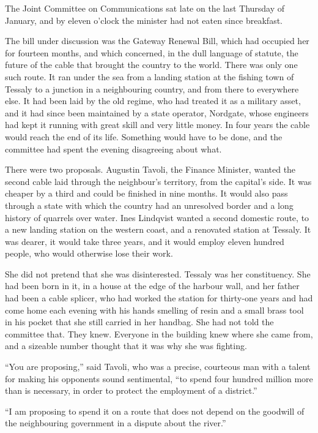 \scenebreak
\noindent The Joint Committee on Communications sat late on the last Thursday of January, and by eleven o'clock the minister had not eaten since breakfast.

The bill under discussion was the Gateway Renewal Bill, which had occupied her for fourteen months, and which concerned, in the dull language of statute, the future of the cable that brought the country to the world. There was only one such route. It ran under the sea from a landing station at the fishing town of Tessaly to a junction in a neighbouring country, and from there to everywhere else. It had been laid by the old regime, who had treated it as a military asset, and it had since been maintained by a state operator, Nordgate, whose engineers had kept it running with great skill and very little money. In four years the cable would reach the end of its life. Something would have to be done, and the committee had spent the evening disagreeing about what.

There were two proposals. Augustin Tavoli, the Finance Minister, wanted the second cable laid through the neighbour's territory, from the capital's side. It was cheaper by a third and could be finished in nine months. It would also pass through a state with which the country had an unresolved border and a long history of quarrels over water. Ines Lindqvist wanted a second domestic route, to a new landing station on the western coast, and a renovated station at Tessaly. It was dearer, it would take three years, and it would employ eleven hundred people, who would otherwise lose their work.

She did not pretend that she was disinterested. Tessaly was her constituency. She had been born in it, in a house at the edge of the harbour wall, and her father had been a cable splicer, who had worked the station for thirty-one years and had come home each evening with his hands smelling of resin and a small brass tool in his pocket that she still carried in her handbag. She had not told the committee that. They knew. Everyone in the building knew where she came from, and a sizeable number thought that it was why she was fighting.

``You are proposing,'' said Tavoli, who was a precise, courteous man with a talent for making his opponents sound sentimental, ``to spend four hundred million more than is necessary, in order to protect the employment of a district.''

``I am proposing to spend it on a route that does not depend on the goodwill of the neighbouring government in a dispute about the river.''

